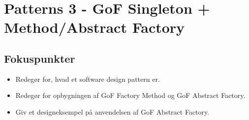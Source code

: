 \section{Patterns 3 - GoF Singleton + Method/Abstract Factory}

\subsection{Fokuspunkter}

\begin{itemize}
	\item Redegør for, hvad et software design pattern er.
	\item Redegør for opbygningen af GoF Factory Method og GoF Abstract Factory.
	\item Giv et designeksempel på anvendelsen af GoF Abstract Factory.
\end{itemize}

